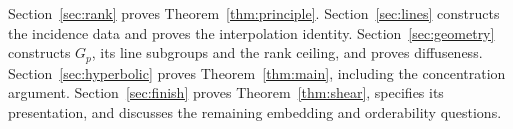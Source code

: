 Section~\ref{sec:rank} proves Theorem~\ref{thm:principle}.
Section~\ref{sec:lines} constructs the incidence data and proves the
interpolation identity. Section~\ref{sec:geometry} constructs \(G_p\),
its line subgroups and the rank ceiling, and proves diffuseness.
Section~\ref{sec:hyperbolic} proves Theorem~\ref{thm:main}, including
the concentration argument. Section~\ref{sec:finish} proves
Theorem~\ref{thm:shear}, specifies its presentation, and discusses the
remaining embedding and orderability questions.
